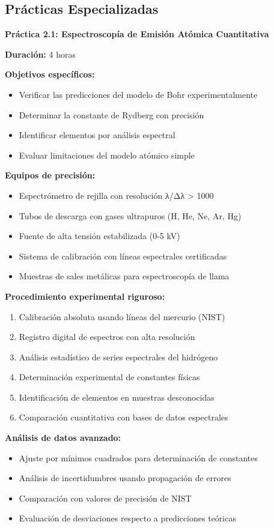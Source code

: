 \begin{tecnologiabox}
\begin{tecnologiabox}
\begin{tecnologiabox}
\begin{teknologiabox}
\section{Prácticas Especializadas}

\begin{practicabox}
\textbf{Práctica 2.1: Espectroscopía de Emisión Atómica Cuantitativa}

\textbf{Duración:} 4 horas

\textbf{Objetivos específicos:}
\begin{itemize}
\item Verificar las predicciones del modelo de Bohr experimentalmente
\item Determinar la constante de Rydberg con precisión
\item Identificar elementos por análisis espectral
\item Evaluar limitaciones del modelo atómico simple
\end{itemize}

\textbf{Equipos de precisión:}
\begin{itemize}
\item Espectrómetro de rejilla con resolución λ/Δλ > 1000
\item Tubos de descarga con gases ultrapuros (H, He, Ne, Ar, Hg)
\item Fuente de alta tensión estabilizada (0-5 kV)
\item Sistema de calibración con líneas espectrales certificadas
\item Muestras de sales metálicas para espectroscopía de llama
\end{itemize}

\textbf{Procedimiento experimental riguroso:}
\begin{enumerate}
\item Calibración absoluta usando líneas del mercurio (NIST)
\item Registro digital de espectros con alta resolución
\item Análisis estadístico de series espectrales del hidrógeno
\item Determinación experimental de constantes físicas
\item Identificación de elementos en muestras desconocidas
\item Comparación cuantitativa con bases de datos espectrales
\end{enumerate}

\textbf{Análisis de datos avanzado:}
\begin{itemize}
\item Ajuste por mínimos cuadrados para determinación de constantes
\item Análisis de incertidumbres usando propagación de errores
\item Comparación con valores de precisión de NIST
\item Evaluación de desviaciones respecto a predicciones teóricas
\end{itemize}


\end{practicabox}
\end{teknologiabox}
\end{tecnologiabox}
\end{tecnologiabox}
\end{tecnologiabox}

